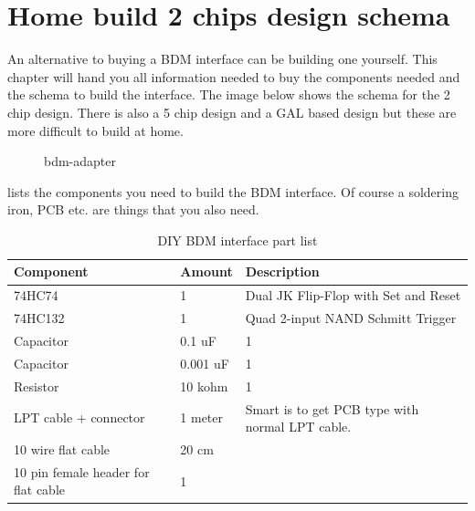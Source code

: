 \documentclass[11pt,a4paper]{book}
\newcommand{\Mfig}[1]{%
\begin{figure}[<+htpb+>]
    \centering
    \missingfigure{#1}
    \caption{#1}
\end{figure}}
\begin{document}
\section{Home build 2 chips design schema}
An alternative to buying a BDM interface can be building one yourself. This chapter will hand you all
information needed to buy the components needed and the schema to build the interface. The image
below shows the schema for the 2 chip design. There is also a 5 chip design and a GAL based design
but these are more difficult to build at home.

\Mfig{bdm-adapter}

 lists the components you need to build the BDM interface. Of course a soldering
iron, PCB etc. are things that you also need.

\begin{table}
    \centering
    \begin{tabular}{lll}
Component & Amount & Description \\
\midrule
74HC74 & 1 & Dual JK Flip-Flop with Set and Reset \\
74HC132 & 1&  Quad 2-input NAND Schmitt Trigger \\
Capacitor &0.1 uF& 1 \\
Capacitor &0.001 uF& 1 \\
Resistor &10 kohm & 1 \\
LPT cable + connector &1 meter& Smart is to get PCB type with normal LPT cable.
\\
10 wire flat cable &20 cm  & \\
10 pin female header for flat cable & 1
    \end{tabular}
    \caption{DIY BDM interface part list}
    \label{tab:bdm-part-list}
\end{table}
\end{document}
